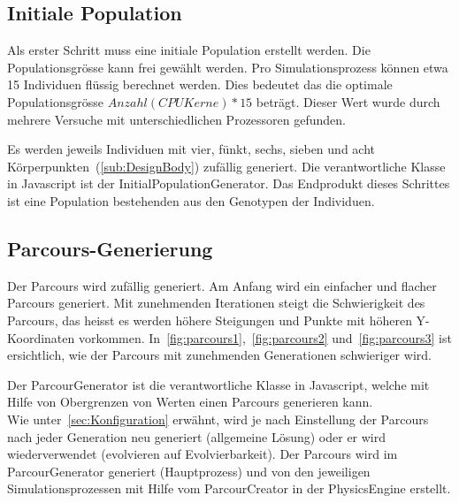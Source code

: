     \subsection{Initiale Population\label{sec:initPop}}

      Als erster Schritt muss eine initiale Population erstellt werden.
      Die Populationsgrösse kann frei gewählt werden.
      Pro Simulationsprozess können etwa 15 Individuen flüssig berechnet werden.
      Dies bedeutet das die optimale Populationsgrösse  \(Anzahl(CPU Kerne) * 15 \) beträgt.
      Dieser Wert wurde durch mehrere Versuche mit unterschiedlichen Prozessoren gefunden.

      \medskip

      Es werden jeweils Individuen mit vier, fünkt, sechs, sieben und acht Körperpunkten~(\vref{sub:DesignBody}) zufällig generiert.
      Die verantwortliche Klasse in Javascript ist der InitialPopulationGenerator.
      Das Endprodukt dieses Schrittes ist eine Population bestehenden aus den Genotypen der Individuen.

    \subsection{Parcours-Generierung\label{sec:ParcourCreation}}

      Der Parcours wird zufällig generiert. Am Anfang wird ein einfacher und flacher Parcours generiert.
      Mit zunehmenden Iterationen steigt die Schwierigkeit des Parcours,
      das heisst es werden höhere Steigungen und Punkte mit höheren Y-Koordinaten vorkommen.
      In~\vref{fig:parcours1},~\vref{fig:parcours2} und~\vref{fig:parcours3} ist ersichtlich,
      wie der Parcours mit zunehmenden Generationen schwieriger wird.

      \medskip

      Der ParcourGenerator ist die verantwortliche Klasse in Javascript,
      welche mit Hilfe von Obergrenzen von Werten einen Parcours generieren kann.
      \\
      Wie unter~\vref{sec:Konfiguration} erwähnt,
      wird je nach Einstellung der Parcours nach jeder Generation neu generiert (allgemeine Lösung) oder
      er wird wiederverwendet (evolvieren auf Evolvierbarkeit).
      Der Parcours wird im ParcourGenerator generiert (Hauptprozess) und
      von den jeweiligen Simulationsprozessen mit Hilfe vom ParcourCreator in der \gls{PhysicsEngine} erstellt.

      \vspace{1cm}

